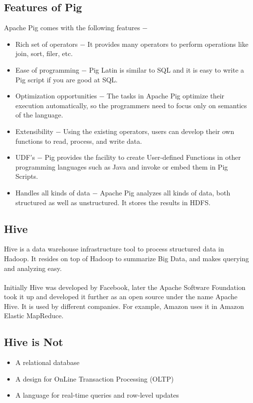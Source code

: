 \begin{itemize}
\subsection*{Features of Pig}

Apache Pig comes with the following features −
\begin{itemize}
\item Rich set of operators − It provides many operators to perform operations like join, sort, filer, etc.

\item Ease of programming − Pig Latin is similar to SQL and it is easy to write a Pig script if you are good at SQL.

\item Optimization opportunities − The tasks in Apache Pig optimize their execution automatically, so the programmers need to focus only on semantics of the language.

\item Extensibility − Using the existing operators, users can develop their own functions to read, process, and write data.

\item UDF’s − Pig provides the facility to create User-defined Functions in other programming languages such as Java and invoke or embed them in Pig Scripts.

\item Handles all kinds of data − Apache Pig analyzes all kinds of data, both structured as well as unstructured. It stores the results in HDFS.
\end{itemize}
\subsection{Hive}

Hive is a data warehouse infrastructure tool to process structured data in Hadoop. It resides on top of Hadoop to summarize Big Data, and makes querying and analyzing easy.
\\
\\
Initially Hive was developed by Facebook, later the Apache Software Foundation took it up and developed it further as an open source under the name Apache Hive. It is used by different companies. For example, Amazon uses it in Amazon Elastic MapReduce.
\subsection*{Hive is Not}
\begin{itemize}
	\item A relational database
	\item A design for OnLine Transaction Processing (OLTP)
	\item A language for real-time queries and row-level updates
\end{itemize}

\end{itemize}
